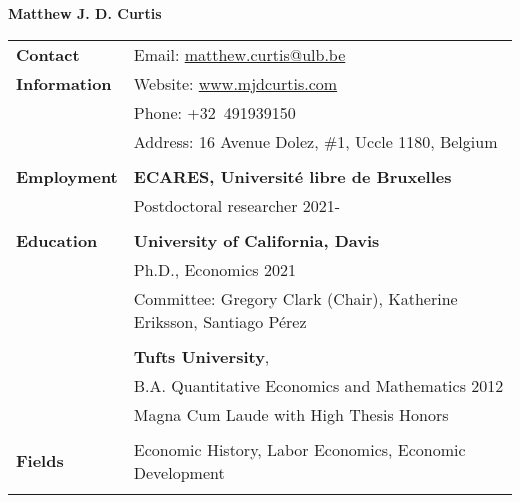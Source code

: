 \documentclass[a4paper,11pt,oneside]{article}
\begin{document}

\noindent  \LARGE{\textbf{Matthew J. D. Curtis}}  \\

\normalsize




\noindent \begin{longtable}{@{} p{0.175\linewidth} p{0.775\linewidth} p{0.05\linewidth}}


  
 \textbf{\large{Contact}}    &  \multicolumn{2}{l}{Email: \href{mailto:matthew.curtis@ulb.be}{matthew.curtis@ulb.be} }\\
   \textbf{\large{Information}}  &  \multicolumn{2}{l}{Website: \href{https://www.mjdcurtis.com/}{www.mjdcurtis.com} }\\
   &  \multicolumn{2}{l}{Phone: +32~491939150}\\
      &  \multicolumn{2}{l}{Address: 16 Avenue Dolez, \#1, Uccle 1180, Belgium}\\
      \\ 

      \textbf{\large{Employment}}    & \multicolumn{2}{l}{\textbf{ECARES, Universit\'{e} libre de Bruxelles }} \\
      &  \multicolumn{2}{l}{ Postdoctoral researcher \hfill  2021-}\\
    \\
 \textbf{\large{Education}}    & \multicolumn{2}{l}{\textbf{University of California, Davis}} \\
     &  \multicolumn{2}{l}{ Ph.D., Economics \hfill  2021}\\
   &   \multicolumn{2}{l}{ Committee: Gregory Clark (Chair), Katherine Eriksson, Santiago P\'{e}rez}\\

   \\
     & \multicolumn{2}{l}{ \textbf{Tufts University},}\\
     & \multicolumn{2}{l}{B.A. Quantitative Economics and Mathematics \hfill  2012}\\
     & \multicolumn{2}{l}{Magna Cum Laude  with High Thesis Honors   }\\
     &  \multicolumn{2}{l}{ }\\
     \textbf{\large{Fields}}    &  \multicolumn{2}{l}{ Economic History,  Labor Economics, Economic Development}\\
     \\


\end{longtable}
\end{document}
